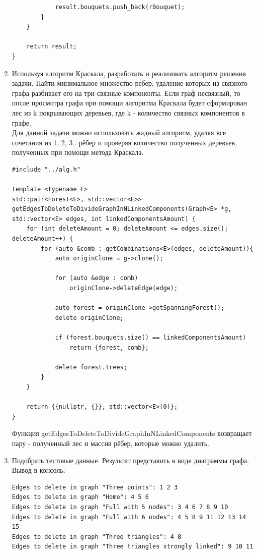 \documentclass[a4paper,14pt]{extarticle}
\begin{document}
\begin{enumerate}[1.]
\begin{verbatim}
            result.bouquets.push_back(rBouquet);
        }
    }

    return result;
}
        \end{verbatim}
        \item Используя алгоритм Краскала, разработать и реализовать алгоритм решения задачи.\bigbreak
        Найти минимальное множество ребер, удаление которых из связного графа разбивает его на три связные компоненты.\bigbreak
        Если граф несвязный, то после просмотра графа при помощи алгоритма Краскала будет сформирован лес из k покрывающих деревьев,
        где k - количество связных компонентов в графе.\\
        Для данной задачи можно использовать жадный алгоритм, удаляя все сочетания из 1, 2, 3.. рёбер и проверяя количество полученных
        деревьев, полученных при помощи метода Краскала.
        \begin{verbatim}
#include "../alg.h"

template <typename E>
std::pair<Forest<E>, std::vector<E>> getEdgesToDeleteToDivideGraphInNLinkedComponents(Graph<E> *g, std::vector<E> edges, int linkedComponentsAmount) {
    for (int deleteAmount = 0; deleteAmount <= edges.size(); deleteAmount++) {
        for (auto &comb : getCombinations<E>(edges, deleteAmount)){
            auto originClone = g->clone();
            
            for (auto &edge : comb)
                originClone->deleteEdge(edge);
            
            auto forest = originClone->getSpanningForest();
            delete originClone;

            if (forest.bouquets.size() == linkedComponentsAmount) 
                return {forest, comb};

            delete forest.trees;
        }
    }

    return {{nullptr, {}}, std::vector<E>(0)};
}
        \end{verbatim}
        Функция getEdgesToDeleteToDivideGraphInNLinkedComponents возвращает пару - полученный лес и массив рёбер, которые можно удалить.
        \item Подобрать тестовые данные. Результат представить в виде диаграммы графа.\\
        Вывод в консоль:
                    \begin{verbatim}
Edges to delete in graph "Three points": 1 2 3
Edges to delete in graph "Home": 4 5 6
Edges to delete in graph "Full with 5 nodes": 3 4 6 7 8 9 10 
Edges to delete in graph "Full with 6 nodes": 4 5 8 9 11 12 13 14 15 
Edges to delete in graph "Three triangles": 4 8
Edges to delete in graph "Three triangles strongly linked": 9 10 11 
                    \end{verbatim}
        

\end{enumerate}
\end{document}
